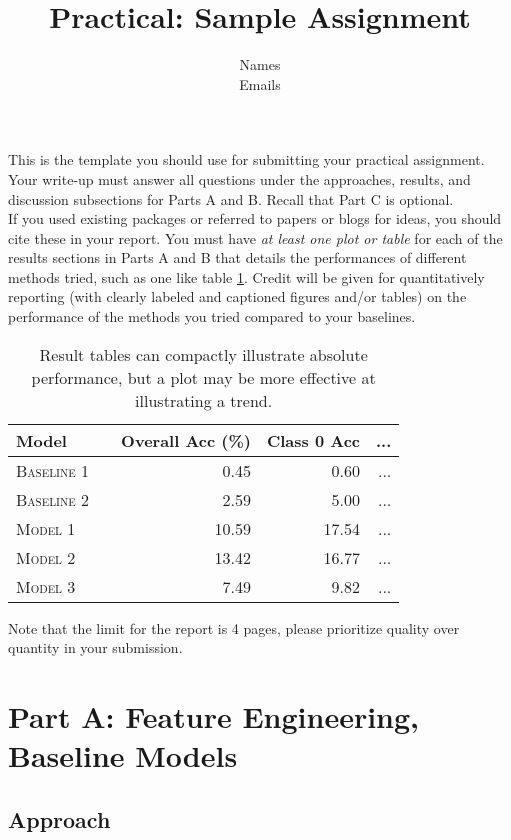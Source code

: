 \documentclass[11pt]{article}
\title{Practical: Sample Assignment}
\author{Names \\ Emails}
\date{}
\begin{document}
\maketitle{}


\noindent This is the template you should use for submitting your practical assignment. Your write-up must answer all questions under the approaches, results, and discussion subsections for Parts A and B. Recall that Part C is optional. \\

\noindent If you used existing packages or referred to papers or blogs for ideas,  you should cite these in your report.  You must have \textit{at least one plot or table} for each of the results sections in Parts A and B that details the performances of different methods tried, such as one like table \ref{tab:results}. Credit will be given for quantitatively reporting (with clearly labeled and captioned figures and/or tables) on the performance of the methods you tried compared to your baselines.\\

\begin{table}
\centering
\begin{tabular}{llrrr}
 \toprule
 Model &  & Overall Acc (\%) & Class 0 Acc & ... \\
 \midrule
 \textsc{Baseline 1} & & 0.45 & 0.60 & ...\\
 \textsc{Baseline 2} & & 2.59 & 5.00 & ... \\
 \textsc{Model 1} & & 10.59 & 17.54 & ... \\
 \textsc{Model 2} & &13.42 & 16.77 & ... \\
 \textsc{Model 3} & & 7.49 & 9.82 & ... \\
 \bottomrule
\end{tabular}
\caption{\label{tab:results} Result tables can compactly illustrate absolute performance, but a plot may be more effective at illustrating a trend.}
\end{table}


\noindent Note that the limit for the report is 4 pages, please prioritize quality over 
quantity in your submission.\\

\section{Part A: Feature Engineering, Baseline Models}

\subsection{Approach}
\end{document}
